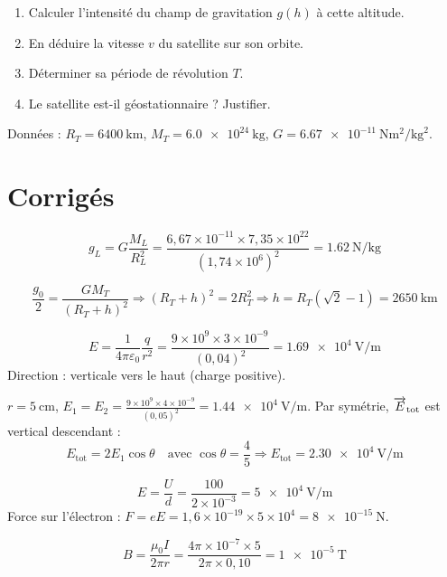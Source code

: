 \begin{enumerate}[label=\arabic*)]
\item Calculer l’intensité du champ de gravitation $g(h)$ à cette altitude.
\item En déduire la vitesse $v$ du satellite sur son orbite.
\item Déterminer sa période de révolution $T$.
\item Le satellite est-il géostationnaire ? Justifier.
\end{enumerate}

Données : $R_T = \SI{6400}{\kilo\metre}$, $M_T = \SI{6.0e24}{\kilogram}$, $G = \SI{6.67e-11}{\newton\metre\squared\per\kilogram\squared}$.

\section{Corrigés}

\[
g_L = G\frac{M_L}{R_L^2} = \frac{6,67\times10^{-11}\times7,35\times10^{22}}{(1,74\times10^{6})^2} = \SI{1.62}{\newton\per\kilogram}
\]

\[
\frac{g_0}{2} = \frac{GM_T}{(R_T+h)^2} \Rightarrow (R_T+h)^2 = 2R_T^2 \Rightarrow h = R_T(\sqrt{2}-1) = \SI{2650}{\kilo\metre}
\]

\[
E = \frac{1}{4\pi\varepsilon_0}\frac{q}{r^2} = \frac{9\times10^9\times3\times10^{-9}}{(0,04)^2} = \SI{1.69e4}{\volt\per\metre}
\]
Direction : verticale vers le haut (charge positive).

$r = \SI{5}{\centi\metre}$, $E_1 = E_2 = \frac{9\times10^9\times4\times10^{-9}}{(0,05)^2} = \SI{1.44e4}{\volt\per\metre}$.
Par symétrie, $\overrightarrow{E}_{\text{tot}}$ est vertical descendant :
\[
E_{\text{tot}} = 2E_1\cos\theta \quad\text{avec }\cos\theta = \frac{4}{5} \Rightarrow E_{\text{tot}} = \SI{2.30e4}{\volt\per\metre}
\]

\[
E = \frac{U}{d} = \frac{100}{2\times10^{-3}} = \SI{5e4}{\volt\per\metre}
\]
Force sur l’électron : $F = eE = 1,6\times10^{-19}\times5\times10^{4} = \SI{8e-15}{\newton}$.

\[
B = \frac{\mu_0 I}{2\pi r} = \frac{4\pi\times10^{-7}\times5}{2\pi\times0,10} = \SI{1e-5}{\tesla}
\]

